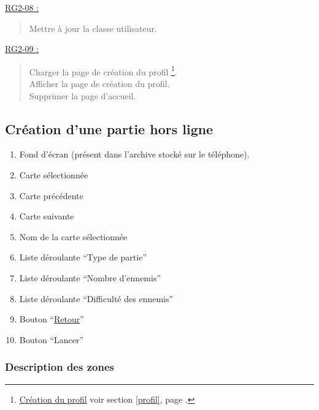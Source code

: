 \documentclass{report}
\begin{document}
		\underline{RG2-08 :}
			\begin{quote}
				Mettre à jour la classe utilisateur.\\
			\end{quote}


		\underline{RG2-09 :}
			\begin{quote}
				Charger la page de création du profil%
					\footnote{
						\hyperlink{profil}{Création du profil}
						\og voir section \ref{profil}, page \pageref{profil}.\fg
					}.\\
				Afficher la page de création du profil\footnotemark[9].\\
				Supprimer la page d'accueil\footnotemark[2].\\
			\end{quote}

	
\newpage

	\subsection{Création d'une partie hors ligne}
	
		\hypertarget{Creer partie solo}{}
		\label{Creer partie solo}

		\begin{center}
					
		\end{center}
		
		\begin{enumerate}
		  \item Fond d'écran (présent dans l'archive stocké sur le téléphone).
		  \item Carte sélectionnée
		  \item Carte précédente
		  \item Carte suivante
		  \item Nom de la carte sélectionnée
		  \item Liste déroulante ``Type de partie''
		  \item Liste déroulante ``Nombre d'ennemis''
		  \item Liste déroulante ``Difficulté des ennemis''
		  \item Bouton ``\hyperlink{Page d'accueil}{Retour}''
		  \item Bouton ``Lancer'' 
		\end{enumerate}
		
		\subsubsection{Description des zones}
		
\end{document}
